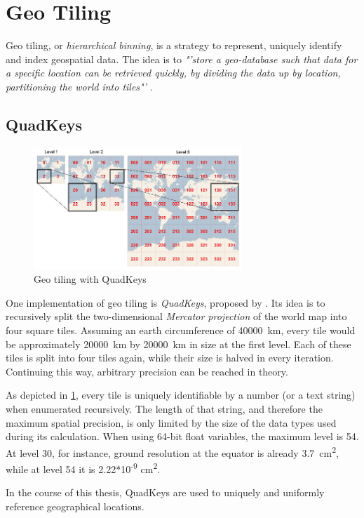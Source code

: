 \section{Geo Tiling}
\label{sec:background:geo_tiling}
Geo tiling, or \textit{hierarchical binning}, is a strategy to represent, uniquely identify and index geospatial data. The idea is to \textit{"'store a geo-database such that data for a specific location can be retrieved quickly, by dividing the data up by location, partitioning the world into tiles"'} \cite{wiki:quadtiles}. 

\subsection{QuadKeys}
\label{subsec:background:quadkeys}

\begin{figure}[H]
	\centering
	\includegraphics[width=0.7\textwidth]{98_images/quadkeys.jpg}
	\caption[Geo tiling with QuadKeys]{Geo tiling with QuadKeys \cite{wiki:quadtiles}}
	\label{fig:quadkeys}
\end{figure}


One implementation of geo tiling is \textit{QuadKeys}, proposed by \cite{Schwartz2018}. Its idea is to recursively split the two-dimensional \textit{Mercator projection} of the world map into four square tiles. Assuming an earth circumference of \SI{40000}{\kilo\meter}, every tile would be approximately \SI{20000}{\kilo\meter} by \SI{20000}{\kilo\meter} in size at the first level. Each of these tiles is split into four tiles again, while their size is halved in every iteration. Continuing this way, arbitrary precision can be reached in theory.

As depicted in \cref{fig:quadkeys}, every tile is uniquely identifiable by a number (or a text string) when enumerated recursively. The length of that string, and therefore the maximum spatial precision, is only limited by the size of the data types used during its calculation. When using 64-bit float variables, the maximum level is 54. At level 30, for instance, ground resolution at the equator is already \SI{3.7}{\square\centi\meter}, while at level 54 it is 2.22*10\textsuperscript{-9} \si{\square\centi\meter}.
\par
\bigskip

In the course of this thesis, QuadKeys are used to uniquely and uniformly reference geographical locations. 